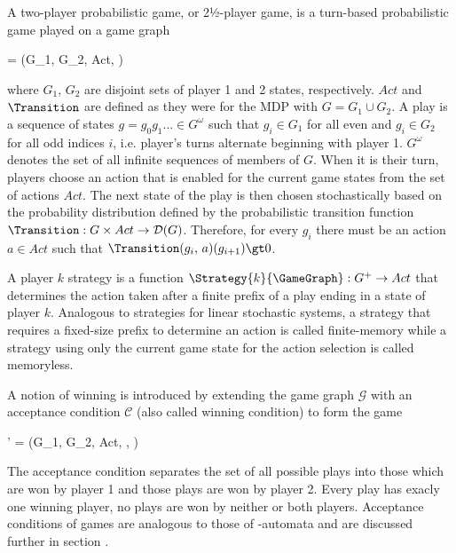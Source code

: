 \stopsubsection


\startsubsection[title={2-Player Probabilistic Games},reference=sec:theory-games-games]

    A two-player probabilistic game, or 2½-player game, is a turn-based probabilistic game played on a game graph

    \startformula
        \GameGraph = (G_1, G_2, Act, \Transition) \EndComma
    \stopformula

    where $G_1$, $G_2$ are disjoint sets of player 1 and 2 states, respectively.
    $Act$ and $\Transition$ are defined as they were for the MDP with $G = G_1 \cup G_2$.
    A play is a sequence of states $g = g_0 g_1 ... \in G^\omega$ such that $g_i \in G_1$ for all even and $g_i \in G_2$ for all odd indices $i$, i.e. player's turns alternate beginning with player 1.
    $G^\omega$ denotes the set of all infinite sequences of members of $G$.
    When it is their turn, players choose an action that is enabled for the current game states from the set of actions $Act$.
    The next state of the play is then chosen stochastically based on the probability distribution defined by the probabilistic transition function $\Transition: G \times Act \rightarrow \mathcal{D}(G)$.
    Therefore, for every $g_i$ there must be an action $a \in Act$ such that $\Transition(g_i,\, a)(g_{i+1}) \gt 0$.

    A player $k$ strategy is a function $\Strategy{k}{\GameGraph}: G^+ \rightarrow Act$ that determines the action taken after a finite prefix of a play ending in a state of player $k$.
    Analogous to strategies for linear stochastic systems, a strategy that requires a fixed-size prefix to determine an action is called finite-memory while a strategy using only the current game state for the action selection is called memoryless.

\stopsubsection


\startsubsection[title={Winning and Solving 2-Player Probabilistic Games}]

    A notion of winning is introduced by extending the game graph $\mathcal{G}$ with an acceptance condition $\mathcal{C}$ (also called winning condition) to form the game

    \startformula
        \GameGraph' = (G_1, G_2, Act, \Transition, \Condition) \EndPeriod
    \stopformula

    The acceptance condition separates the set of all possible plays into those which are won by player 1 and those plays are won by player 2.
    Every play has exacly one winning player, no plays are won by neither or both players.
    Acceptance conditions of games are analogous to those of \omega-automata and are discussed further in section .

